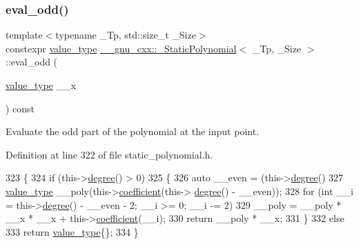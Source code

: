 \subsubsection{\texorpdfstring{eval\+\_\+odd()}{eval\_odd()}\hspace{0.1cm}{\footnotesize\ttfamily [1/2]}}
{\footnotesize\ttfamily template$<$typename \+\_\+\+Tp, std\+::size\+\_\+t \+\_\+\+Size$>$ \\
constexpr \hyperlink{class____gnu__cxx_1_1__StaticPolynomial_aad5f3d6d5876b6926b30724aeac649d6}{value\+\_\+type} \hyperlink{class____gnu__cxx_1_1__StaticPolynomial}{\+\_\+\+\_\+gnu\+\_\+cxx\+::\+\_\+\+Static\+Polynomial}$<$ \+\_\+\+Tp, \+\_\+\+Size $>$\+::eval\+\_\+odd (\begin{DoxyParamCaption}\item[{\hyperlink{class____gnu__cxx_1_1__StaticPolynomial_aad5f3d6d5876b6926b30724aeac649d6}{value\+\_\+type}}]{\+\_\+\+\_\+x }\end{DoxyParamCaption}) const\hspace{0.3cm}{\ttfamily [inline]}}

Evaluate the odd part of the polynomial at the input point. 

Definition at line 322 of file static\+\_\+polynomial.\+h.


\begin{DoxyCode}
323       \{
324         \textcolor{keywordflow}{if} (this->\hyperlink{class____gnu__cxx_1_1__StaticPolynomial_a5977dac3a84e8a43f3e9da28b62ca46a}{degree}() > 0)
325           \{
326             \textcolor{keyword}{auto} \_\_even = (this->\hyperlink{class____gnu__cxx_1_1__StaticPolynomial_a5977dac3a84e8a43f3e9da28b62ca46a}{degree}() %
327             \hyperlink{class____gnu__cxx_1_1__StaticPolynomial_aad5f3d6d5876b6926b30724aeac649d6}{value\_type} \_\_poly(this->\hyperlink{class____gnu__cxx_1_1__StaticPolynomial_a74535a3f8f586223097b30891bc1402b}{coefficient}(this->
      \hyperlink{class____gnu__cxx_1_1__StaticPolynomial_a5977dac3a84e8a43f3e9da28b62ca46a}{degree}() - \_\_even));
328             \textcolor{keywordflow}{for} (\textcolor{keywordtype}{int} \_\_i = this->\hyperlink{class____gnu__cxx_1_1__StaticPolynomial_a5977dac3a84e8a43f3e9da28b62ca46a}{degree}() - \_\_even - 2; \_\_i >= 0; \_\_i -= 2)
329               \_\_poly = \_\_poly * \_\_x * \_\_x + this->\hyperlink{class____gnu__cxx_1_1__StaticPolynomial_a74535a3f8f586223097b30891bc1402b}{coefficient}(\_\_i);
330             \textcolor{keywordflow}{return} \_\_poly * \_\_x;
331           \}
332         \textcolor{keywordflow}{else}
333           \textcolor{keywordflow}{return} \hyperlink{class____gnu__cxx_1_1__StaticPolynomial_aad5f3d6d5876b6926b30724aeac649d6}{value\_type}\{\};
334       \}
\end{DoxyCode}
\mbox{\label{class____gnu__cxx_1_1__StaticPolynomial_a7cc56f1084578939b0b7f796936c6419}} 
